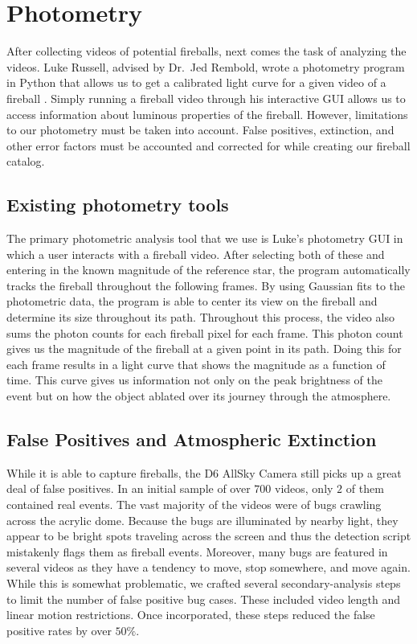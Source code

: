 \section{Photometry}
After collecting videos of potential fireballs, next comes the task of analyzing the videos.
Luke Russell, advised by Dr.~Jed Rembold, wrote a photometry program in Python that allows us to get a calibrated light curve for a given video of a fireball \cite{russell_photometry_2018}.
Simply running a fireball video through his interactive GUI allows us to access information about luminous properties of the fireball.
However, limitations to our photometry must be taken into account.
False positives, extinction, and other error factors must be accounted and corrected for while creating our fireball catalog.

\subsection{Existing photometry tools}
The primary photometric analysis tool that we use is Luke's photometry GUI in which a user interacts with a fireball video.
After selecting both of these and entering in the known magnitude of the reference star, the program automatically tracks the fireball throughout the following frames.
By using Gaussian fits to the photometric data, the program is able to center its view on the fireball and determine its size throughout its path.
Throughout this process, the video also sums the photon counts for each fireball pixel for each frame.
This photon count gives us the magnitude of the fireball at a given point in its path.
Doing this for each frame results in a light curve that shows the magnitude as a function of time.
This curve gives us information not only on the peak brightness of the event but on how the object ablated over its journey through the atmosphere.

\subsection{False Positives and Atmospheric Extinction}

While it is able to capture fireballs, the D6 AllSky Camera still picks up a great deal of false positives.
In an initial sample of over $700$ videos, only $2$ of them contained real events.
The vast majority of the videos were of bugs crawling across the acrylic dome.
Because the bugs are illuminated by nearby light, they appear to be bright spots traveling across the screen and thus the detection script mistakenly flags them as fireball events.
Moreover, many bugs are featured in several videos as they have a tendency to move, stop somewhere, and move again.
While this is somewhat problematic, we crafted several secondary-analysis steps to limit the number of false positive bug cases.
These included video length and linear motion restrictions.
Once incorporated, these steps reduced the false positive rates by over $50\%$.

